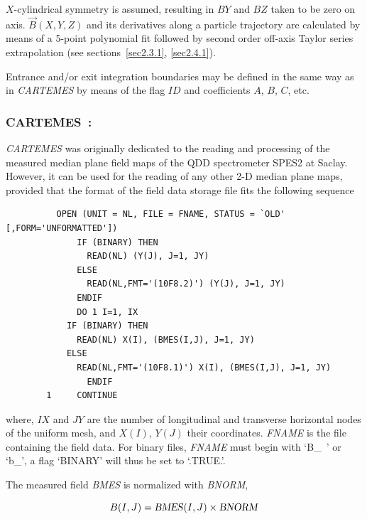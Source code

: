 \bigskip

\noindent $X$-cylindrical symmetry is assumed, resulting in $BY$ and $BZ$ taken to 
be zero on axis. $ \vec {B} {(X,Y,Z)} $ and its derivatives along a
particle trajectory are calculated by means of a 5-point polynomial fit followed by second 
order off-axis Taylor series extrapolation (see sections~\ref{sec2.3.1}, \ref{sec2.4.1}).  
\bigskip

\noindent Entrance and/or exit integration boundaries may be defined in the same way 
as in \textsl{CARTEMES} by means of the flag $ID$ and coefficients
$A$, $B$, $C$, etc. 

\newpage

\subsubsection*{CARTEMES~: \CARTEMESTitl}\label{CARTEMES}
\medskip

\textsl{CARTEMES}  was originally dedicated to the reading 
and processing of
the measured median plane field maps of the QDD spectrometer  SPES2 at Saclay.  However, it can be
used for the reading of any other 2-D median plane maps, provided that the format of the
field data storage file fits the following \FORTRAN sequence 


{\footnotesize
\begin{verbatim}
	      OPEN (UNIT = NL, FILE = FNAME, STATUS = `OLD' [,FORM='UNFORMATTED'])
              IF (BINARY) THEN 
                READ(NL) (Y(J), J=1, JY)
              ELSE
                READ(NL,FMT='(10F8.2)') (Y(J), J=1, JY)
              ENDIF
              DO 1 I=1, IX
	        IF (BINARY) THEN 
	          READ(NL) X(I), (BMES(I,J), J=1, JY)
	        ELSE
	          READ(NL,FMT='(10F8.1)') X(I), (BMES(I,J), J=1, JY) 
                ENDIF
        1     CONTINUE
\end{verbatim}}

\noindent where, $IX$  and $JY$  are the number of longitudinal
and transverse horizontal nodes of the uniform mesh, and $X(I)$, $Y(J)$ their coordinates.  
\textsl{FNAME} 
 is the file containing the field data. For binary files, \textsl{FNAME} must begin with
\mbox{`B\_ '} or \mbox{`b\_'},  a flag `BINARY' will thus be set to `.TRUE.'.  
\bigskip

\noindent The measured field \textsl{BMES} is normalized with \textsl{BNORM},

$$ B(I,J) = \text{\textsl{BMES}}(I,J) \times  \text{\textsl{BNORM}} $$

